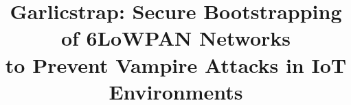 \documentclass{sig-alternate-05-2015}
\begin{document}






%

\title{Garlicstrap: Secure Bootstrapping of 6LoWPAN Networks\\ to Prevent Vampire Attacks in IoT Environments}
%
%
%
%
%
\end{document}
